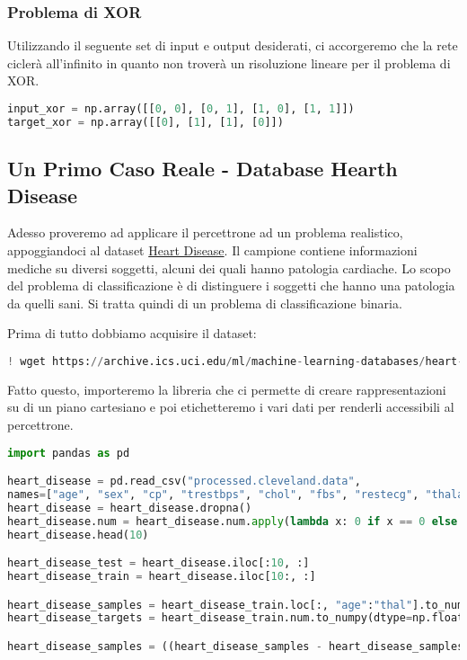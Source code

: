 \documentclass[12pt, a4paper]{article}
\begin{document}
\subsubsection{Problema di XOR}
Utilizzando il seguente set di input e output desiderati, ci accorgeremo che la rete ciclerà all'infinito in quanto non troverà un risoluzione lineare per il problema di XOR.
\begin{lstlisting}[language=Python, caption=Inizializzazione]
input_xor = np.array([[0, 0], [0, 1], [1, 0], [1, 1]])
target_xor = np.array([[0], [1], [1], [0]])    
\end{lstlisting}

\subsection{Un Primo Caso Reale - Database Hearth Disease}
Adesso proveremo ad applicare il percettrone ad un problema realistico, appoggiandoci al dataset \href{https://archive.ics.uci.edu/ml/datasets/Heart+Disease}{Heart Disease}. Il campione contiene informazioni mediche su diversi soggetti, alcuni dei quali hanno patologia cardiache. Lo scopo del problema di classificazione è di distinguere i soggetti che hanno una patologia da quelli sani. Si tratta quindi di un problema di classificazione binaria.

Prima di tutto dobbiamo acquisire il dataset:

\begin{lstlisting}[language=Python, caption=Acquisizione del Dataset]
! wget https://archive.ics.uci.edu/ml/machine-learning-databases/heart-disease/processed.cleveland.data
\end{lstlisting}

Fatto questo, importeremo la libreria che ci permette di creare rappresentazioni su di un piano cartesiano e poi etichetteremo i vari dati per renderli accessibili al percettrone.

\begin{lstlisting}[language=Python, caption=Importazione Libreria Grafica e Labelling]
import pandas as pd

heart_disease = pd.read_csv("processed.cleveland.data",
names=["age", "sex", "cp", "trestbps", "chol", "fbs", "restecg", "thalach", "exang", "oldpeak", "slope", "ca", "thal", "num"], na_values='?')
heart_disease = heart_disease.dropna()
heart_disease.num = heart_disease.num.apply(lambda x: 0 if x == 0 else 1)
heart_disease.head(10)

heart_disease_test = heart_disease.iloc[:10, :]
heart_disease_train = heart_disease.iloc[10:, :]

heart_disease_samples = heart_disease_train.loc[:, "age":"thal"].to_numpy()
heart_disease_targets = heart_disease_train.num.to_numpy(dtype=np.float64)

heart_disease_samples = ((heart_disease_samples - heart_disease_samples.mean(axis=0)) / heart_disease_samples.std(axis=0))
\end{lstlisting}
\end{document}
